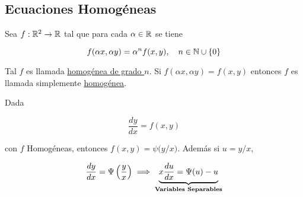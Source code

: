 \subsection*{Ecuaciones Homogéneas}

\begin{defn}
    Sea $f: \mathbb{R}^2 \rightarrow \mathbb{R}$ tal que para cada $\alpha \in \mathbb{R}$ se tiene

    \[
        f(\alpha x, \alpha y) = \alpha^n f(x, y), \quad n \in \mathbb{N} \cup \{0\}
    \]

    Tal $f$ es llamada \ul{homogénea de grado $n$}. Si $f(\alpha x, \alpha y) = f(x, y)$ entonces $f$ es llamada simplemente \ul{homogénea}.
\end{defn}

\begin{pro}
    Dada

    \[
        \frac{dy}{dx} = f(x,y)
    \]

    con $f$ Homogéneas, entonces $f(x, y) = \psi \Big( y/x \Big)$. Además si $u = y/x$,

    \[
        \frac{dy}{dx} = \Psi \left( \frac{y}{x} \right) \implies \LaTeXunderbrace{x\frac{du}{dx} = \Psi(u) - u}_{\text{\textbf{Variables Separables}}}
    \]
\end{pro}